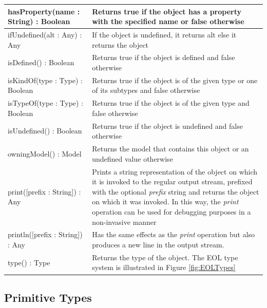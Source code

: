 \begin{longtabu} {|p{6.5cm}|X|}
    hasProperty(name : String) : Boolean & Returns true if the object has a property with the specified name or false otherwise \\\hline
    
    ifUndefined(alt : Any) : Any & If the object is undefined, it returns alt else it returns the object \\\hline
    
    isDefined() : Boolean & Returns true if the object is defined and false otherwise \\\hline
    
    isKindOf(type : Type) : Boolean & Returns true if the object is of the given type or one of its subtypes and false otherwise \\\hline
    
    isTypeOf(type : Type) : Boolean & Returns true if the object is of the given type and false otherwise \\\hline
    
    isUndefined() : Boolean & Returns true if the object is undefined and false otherwise \\\hline
    
    owningModel() : Model & Returns the model that contains this object or an undefined value otherwise \\\hline
    
    print([prefix : String]) : Any & Prints a string representation of the object on which it is invoked to the regular output stream, prefixed with the optional \emph{prefix} string and returns the object on which it was invoked. In this way, the \emph{print} operation can be used for debugging purposes in a non-invasive manner\\\hline
    
    println([prefix : String]) : Any & Has the same effects as the \emph{print} operation but also produces a new line in the output stream. \\\hline
    
    type() : Type & Returns the type of the object. The EOL type system is illustrated in Figure \ref{fig:EOLTypes} \\\hline

\end{longtabu}

\subsection{Primitive Types} 

